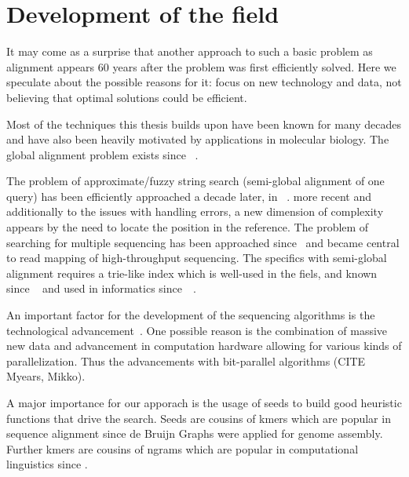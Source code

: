\section{Development of the field}

It may come as a surprise that another approach to such a basic problem as
alignment appears 60 years after the problem was first efficiently solved. Here
we speculate about the possible reasons for it: focus on new technology and
data, not believing that optimal solutions could be efficient.


Most of the techniques this thesis builds upon have been known for many decades
and have also been heavily motivated by applications in molecular biology. The
global alignment problem exists since
\citeyear{vintsyuk1968speech}~\cite{vintsyuk1968speech,needleman1970general}.

The problem of approximate/fuzzy string search (semi-global alignment of one
query) has been efficiently approached a decade later, in
\citeyear{sellers1980theory}~\cite{sellers1980theory,smith1981identification}.
more recent and additionally to the issues with handling errors, a new dimension
of complexity appears by the need to locate the position in the reference. The
problem of searching for multiple sequencing has been approached
since\citeyear{pearson1988improved}~\cite{pearson1988improved} and became
central to read mapping of high-throughput sequencing. The specifics with
semi-global alignment requires a trie-like index which is well-used in the
fiels, and known since
\citeyear{thue1912gegenseitige}~\cite{thue1912gegenseitige} and used in
informatics since~\citeyear{de1959file}~\cite{de1959file}.

An important factor for the development of the sequencing algorithms is the
technological advancement~\cite{alser2021technology}. One possible reason is the
combination of massive new data and advancement in computation hardware allowing
for various kinds of parallelization. Thus the advancements with bit-parallel
algorithms (CITE Myears, Mikko).

A major importance for our apporach is the usage of seeds to build good
heuristic functions that drive the \A search. Seeds are cousins of kmers which
are popular in sequence alignment since de Bruijn Graphs were applied for genome
assembly. Further kmers are cousins of ngrams which are popular in computational
linguistics since .

